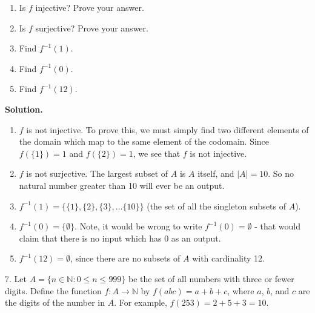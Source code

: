 \documentclass[10pt,]{book}
\theoremstyle{plain}
\theoremstyle{definition}
\theoremstyle{definition}
\theoremstyle{definition}
\def\N{\mathbb N}
\def\inv{^{-1}}
\def\st{:}
\begin{document}
\begin{exerciselist}
\leavevmode%
\begin{enumerate}[label=(\alph*)]
\item\hypertarget{li-315}{}
                Is \(f\) injective? Prove your answer.
\item\hypertarget{li-316}{}
                Is \(f\) surjective? Prove your answer.
\item\hypertarget{li-317}{}
                Find \(f\inv(1)\).
\item\hypertarget{li-318}{}
                Find \(f\inv(0)\).
\item\hypertarget{li-319}{}
                Find \(f\inv(12)\).
\end{enumerate}
\par\smallskip
\par\smallskip
\noindent\textbf{Solution.}\hypertarget{solution-50}{}\quad
\leavevmode%
\begin{enumerate}[label=(\alph*)]
\item\hypertarget{li-320}{}\(f\) is not injective. To prove this, we must simply find two different elements of the domain which map to the same element of the codomain. Since \(f(\{1\}) = 1\) and \(f(\{2\}) = 1\), we see that \(f\) is not injective.\item\hypertarget{li-321}{}\(f\) is not surjective. The largest subset of \(A\) is \(A\) itself, and \(|A| = 10\). So no natural number greater than 10 will ever be an output.\item\hypertarget{li-322}{}\(f\inv(1) = \{\{1\}, \{2\}, \{3\}, \ldots \{10\}\}\) (the set of all the singleton subsets of \(A\)).\item\hypertarget{li-323}{}\(f\inv(0) = \{\emptyset\}\). Note, it would be wrong to write \(f\inv(0) = \emptyset\) - that would claim that there is no input which has 0 as an output.\item\hypertarget{li-324}{}\(f\inv(12) = \emptyset\), since there are no subsets of \(A\) with cardinality 12.\end{enumerate}
\item[7.]\hypertarget{exercise-33}{}
            Let \(A = \{n \in \N \st 0 \le n \le 999\}\) be the set of all numbers with three or fewer digits. Define the function \(f:A \to \N\) by \(f(abc) = a+b+c\), where \(a\), \(b\), and \(c\) are the digits of the number in \(A\). For example, \(f(253) = 2 + 5 + 3 =  10\).
\leavevmode%
\begin{enumerate}[label=(\alph*)]

\end{enumerate}
\end{exerciselist}
\end{document}
